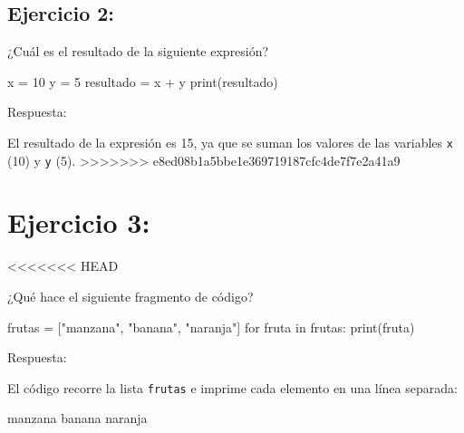 \documentclass[
  a4paper,
  DIV=11,
  numbers=noendperiod,
  onepage,
  openany]{scrreprt}
\newenvironment{Shaded}{\begin{snugshade}}{\end{snugshade}}
\newcommand{\BuiltInTok}[1]{\textcolor[rgb]{0.00,0.23,0.31}{#1}}
\newcommand{\ControlFlowTok}[1]{\textcolor[rgb]{0.00,0.23,0.31}{#1}}
\newcommand{\DecValTok}[1]{\textcolor[rgb]{0.68,0.00,0.00}{#1}}
\newcommand{\KeywordTok}[1]{\textcolor[rgb]{0.00,0.23,0.31}{#1}}
\newcommand{\NormalTok}[1]{\textcolor[rgb]{0.00,0.23,0.31}{#1}}
\newcommand{\OperatorTok}[1]{\textcolor[rgb]{0.37,0.37,0.37}{#1}}
\newcommand{\StringTok}[1]{\textcolor[rgb]{0.13,0.47,0.30}{#1}}
\begin{document}
\hypertarget{ejercicio-2-1}{%
\section{Ejercicio 2:}\label{ejercicio-2-1}}

¿Cuál es el resultado de la siguiente expresión?

\begin{Shaded}
\begin{Highlighting}[]
\NormalTok{x }\OperatorTok{=} \DecValTok{10}
\NormalTok{y }\OperatorTok{=} \DecValTok{5}
\NormalTok{resultado }\OperatorTok{=}\NormalTok{ x }\OperatorTok{+}\NormalTok{ y}
\BuiltInTok{print}\NormalTok{(resultado)}
\end{Highlighting}
\end{Shaded}

Respuesta:

El resultado de la expresión es 15, ya que se suman los valores de las
variables \texttt{x} (10) y \texttt{y} (5).
\textgreater\textgreater\textgreater\textgreater\textgreater\textgreater\textgreater{}
e8ed08b1a5bbe1e369719187cfc4de7f7e2a41a9

\hypertarget{ejercicio-3}{%
\chapter{Ejercicio 3:}\label{ejercicio-3}}

\textless\textless\textless\textless\textless\textless\textless{} HEAD

¿Qué hace el siguiente fragmento de código?

\begin{Shaded}
\begin{Highlighting}[]
\NormalTok{frutas }\OperatorTok{=}\NormalTok{ [}\StringTok{"manzana"}\NormalTok{, }\StringTok{"banana"}\NormalTok{, }\StringTok{"naranja"}\NormalTok{]}
\ControlFlowTok{for}\NormalTok{ fruta }\KeywordTok{in}\NormalTok{ frutas:}
    \BuiltInTok{print}\NormalTok{(fruta)}
\end{Highlighting}
\end{Shaded}

Respuesta:

El código recorre la lista \texttt{frutas} e imprime cada elemento en
una línea separada:

\begin{Shaded}
\begin{Highlighting}[]
\NormalTok{manzana}
\NormalTok{banana}
\NormalTok{naranja}
\end{Highlighting}
\end{Shaded}
\end{document}
